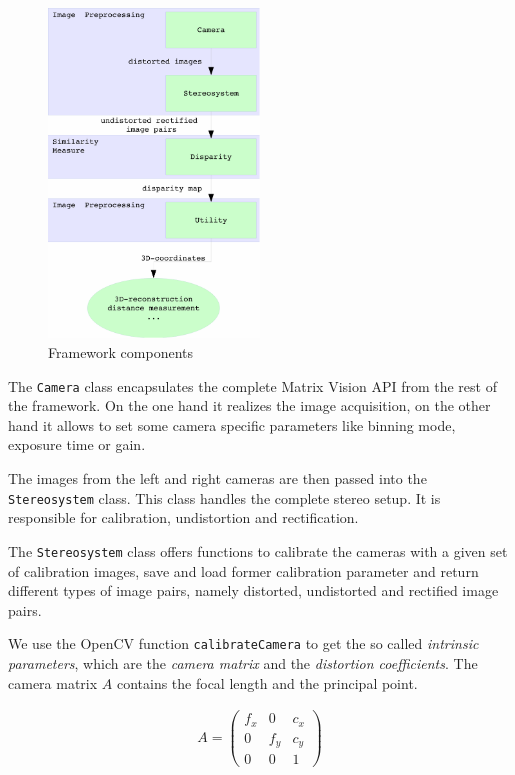 \documentclass[11pt]{article}
\begin{document}
\begin{figure}[H]
        \centering
        \includegraphics[width=0.5\textwidth]{images/graph_composition}
        \caption{Framework components}
        \label{fig:framework}
\end{figure}

The \texttt{Camera} class encapsulates the complete Matrix Vision API from the rest of the framework. On the one hand it realizes the image acquisition, on the other hand it allows to set some camera specific parameters like binning mode, exposure time or gain.

The images from the left and right cameras are then passed into the \texttt{Stereosystem} class. This class handles the complete stereo setup. It is responsible for calibration, undistortion and rectification. 

The \texttt{Stereosystem} class offers functions to calibrate the cameras with a given set of calibration images, save and load former calibration parameter and return different types of image pairs, namely distorted, undistorted and rectified image pairs.

We use the OpenCV function \texttt{calibrateCamera} to get the so called  \emph{intrinsic parameters}, which are the \emph{camera matrix} and the \emph{distortion coefficients}. The camera matrix $A$ contains the focal length and the principal point. 

\begin{align*}
A=
\begin{pmatrix}
f_x & 0 & c_x\\
0 & f_y & c_y\\
0 & 0 & 1
\end{pmatrix}
\end{align*}
\end{document}
